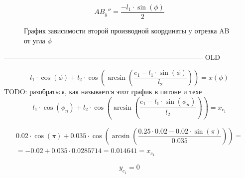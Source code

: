 \begin{equation}\label{eq:yABdphi2}
	AB_y''=\dfrac{-l_1\cdot\sin(\phi)}{2}
\end{equation}

\begin{figure}[H]
	\centering
	\caption{График зависимости второй производной координаты y отрезка AB от угла $\phi$}
\end{figure}
\newpage


--------------------------------------------------------------------------------------
OLD


\begin{equation}\label{eq:formul}
	l_1\cdot\cos(\phi)+l_2\cdot\cos\left(\arcsin\left(\dfrac{e_1-l_1\cdot\sin(\phi)}{l_2}\right)\right)=x(\phi)
\end{equation}
TODO: разобраться, как называется этот график в питоне и техе
\newpage
\begin{equation}\label{eq:xc1}
	l_1\cdot\cos(\phi_n)+l_2\cdot\cos\left(\arcsin\left(\dfrac{e_1-l_1\cdot\sin(\phi_n)}{l_2}\right)\right)=x_{c_1}
\end{equation}

\begin{multline}\label{eq:xc1calc}
	0.02\cdot\cos(\pi)+0.035\cdot\cos\left(\arcsin\left(\dfrac{0.25\cdot 0.02-0.02\cdot\sin(\pi)}{0.035}\right)\right)=\\
	=-0.02+0.035\cdot0.0285714=0.014641=x_{c_1}
\end{multline}

\begin{equation}\label{eq:yc1}
	y_{c_1} = 0
\end{equation}

